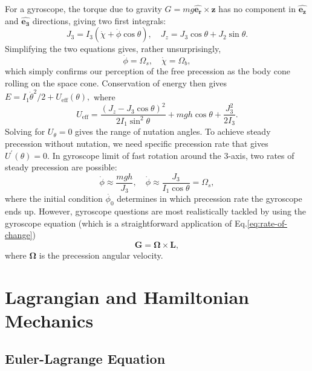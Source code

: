 \documentclass{article}
\begin{document}
For a gyroscope, the torque due to gravity $G = mg \hat{\mathbf{e_r}} \times \mathbf{z}$ has no component in $\hat{\mathbf{e_z}} $ and $\hat{\mathbf{e_3}} $ directions, giving two first integrals:
\[
    J_3 = I_3 (\dot{\chi } + \dot{\phi } \cos{\theta }), \quad 
    J_z = J_3 \cos{\theta } + J_2 \sin \theta. 
\]
Simplifying the two equations gives, rather unsurprisingly, 
\[
    \boxed{
    \dot{\phi } = \Omega_s, \quad 
    \dot{\chi } = \Omega_b, }
\]
which simply confirms our perception of the free precession as the body cone rolling on the space cone. Conservation of energy then gives $E = I_1 \dot{\theta }^{2} /2 + U_{\mathrm{eff}}(\theta),$ where 
\[
    U_{\mathrm{eff}} = \frac{(J_z - J_3 \cos \theta )^{2} }{2I_1 \sin^{2} \theta } + mgh \cos \theta + \frac{J_3 ^{2} }{2I_3}. 
\]
Solving for $U_{\theta } = 0$ gives the range of nutation angles. To achieve steady precession without nutation, we need specific precession rate that gives $U^\prime(\theta ) = 0$. In gyroscope limit of fast rotation around the 3-axis, two rates of steady precession are possible:
\[
    \dot{\phi} \approx \frac{mgh}{J_3}, \quad 
    \dot{\phi } \approx \frac{J_3}{I_1 \cos \theta } = \Omega_s, 
\]
where the initial condition $\dot{\phi_0}$ determines in which precession rate the gyroscope ends up. However, gyroscope questions are most realistically tackled by using the gyroscope equation (which is a straightforward application of Eq.\eqref{eq:rate-of-change})
\[
    \boxed{\mathbf{G} = \boldsymbol{\mathbf{\Omega}} \times \mathbf{L},}
\]
where $\mathbf{\Omega}$ is the precession angular velocity. 

\section{Lagrangian and Hamiltonian Mechanics}
\subsection{Euler-Lagrange Equation}
\end{document}
